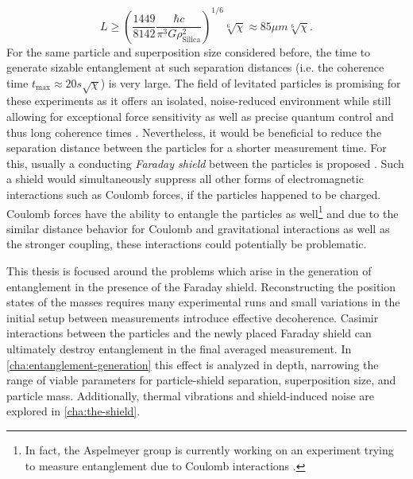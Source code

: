 \begin{equation}
  L \geq \left(\frac{1449}{8142} \frac{\hbar c}{\pi^3 G \rho_\mathrm{Silica}^2}\right)^{1/6} \sqrt[6]{\chi} \approx 85\si{\mu m} \sqrt[6]{\chi} .
\end{equation}
For the same particle and superposition size considered before, the time to generate sizable entanglement at such separation distances (i.e. the coherence time $t_\mathrm{max} \approx 20\si{s} \sqrt{\chi}$) is very large.
The field of levitated particles is promising for these experiments as it offers an isolated, noise-reduced environment while still allowing for exceptional force sensitivity as well as precise quantum control and thus long coherence times \cite{Aspelmeyer_2024,GonzalezBallestero_2021}.
Nevertheless, it would be beneficial to reduce the separation distance between the particles for a shorter measurement time.
For this, usually a conducting \emph{Faraday shield} between the particles is proposed \cite{Schmoele_2016,Kamp_2020}.
Such a shield would simultaneously suppress all other forms of electromagnetic interactions such as Coulomb forces, if the particles happened to be charged.
Coulomb forces have the ability to entangle the particles as well\footnote{In fact, the Aspelmeyer group is currently working on an experiment trying to measure entanglement due to Coulomb interactions \cite{Rudolph_2022}.} and due to the similar distance behavior for Coulomb and gravitational interactions as well as the stronger coupling, these interactions could potentially be problematic.

This thesis is focused around the problems which arise in the generation of entanglement in the presence of the Faraday shield.
Reconstructing the position states of the masses requires many experimental runs and small variations in the initial setup between measurements introduce effective decoherence.
Casimir interactions between the particles and the newly placed Faraday shield can ultimately destroy entanglement in the final averaged measurement.
In \cref{cha:entanglement-generation} this effect is analyzed in depth, narrowing the range of viable parameters for particle-shield separation, superposition size, and particle mass.
Additionally, thermal vibrations and shield-induced noise are explored in \cref{cha:the-shield}.
